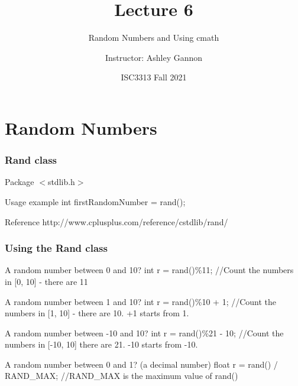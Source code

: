 \documentclass{if-beamer}
\title[Lecture 6]{Lecture 6}
\subtitle{Random Numbers and Using cmath}
\author{Instructor: Ashley Gannon}
\date{ISC3313 Fall 2021}
\begin{document}
\begin{frame}
  \titlepage
\end{frame}

\section{Random Numbers}

\begin{frame}
\frametitle{Rand class}
\begin{block}{Package}
	$<$stdlib.h$>$
\end{block}
\begin{block}{Usage example}
	int firstRandomNumber = rand();
\end{block}
\begin{block}{Reference}
	http://www.cplusplus.com/reference/cstdlib/rand/
\end{block}

\end{frame}


\begin{frame}
\frametitle{Using the Rand class}
\begin{block}{A random number between 0 and 10?}
int r = rand()\%11;  //Count the numbers in [0, 10] - there are 11
\end{block}
\begin{block}{A random number between 1 and 10?}
int r = rand()\%10 + 1;  //Count the numbers in [1, 10] - there are 10. +1 starts from 1.
\end{block}
\begin{block}{A random number between -10 and 10?}
int r = rand()\%21 - 10; //Count the numbers in [-10, 10] there are 21. -10 starts from -10.
\end{block}
\begin{block}{A random number between 0 and 1? (a decimal number)}
float r = rand() / RAND\_MAX; //RAND\_MAX is the maximum value of rand() 
\end{block}
\end{frame}
\end{document}
